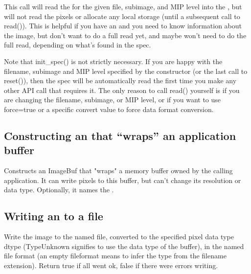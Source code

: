 This call will read the \ImageSpec for the given file, subimage, and
MIP level into the \ImageBuf, but will not read the pixels or allocate
any local storage (until a subsequent call to {\cf read()}).  This is
helpful if you have an \ImageBuf and you need to know information about
the image, but don't want to do a full read yet, and maybe won't need
to do the full read, depending on what's found in the spec.

Note that {\cf init_spec()} is not strictly necessary. If you are happy with
the filename, subimage and MIP level specified by the \ImageBuf constructor
(or the last call to {\cf reset()}), then the spec will be automatically
read the first time you make any other \ImageBuf API call that requires it.
The only reason to call {\cf read()} yourself is if you are changing the
filename, subimage, or MIP level, or if you want to use {\cf force=true} or
a specific {\cf convert} value to force data format conversion.
\apiend


\subsection*{Constructing an \ImageBuf that ``wraps'' an application buffer}

Constructs an ImageBuf that "wraps" a memory buffer owned by the calling
application.  It can write pixels to this buffer, but can't change its
resolution or data type.  Optionally, it names the \ImageBuf.
\apiend


\subsection*{Writing an \ImageBuf to a file}

Write the image to the named file, converted to the specified pixel data
type {\cf dtype} ({\cf TypeUnknown} signifies to use the data type of the
buffer), in the named file format (an empty {\cf fileformat} means to infer
the type from the filename extension).  Return {\cf true} if all went ok,
{\cf false} if there were errors writing.

